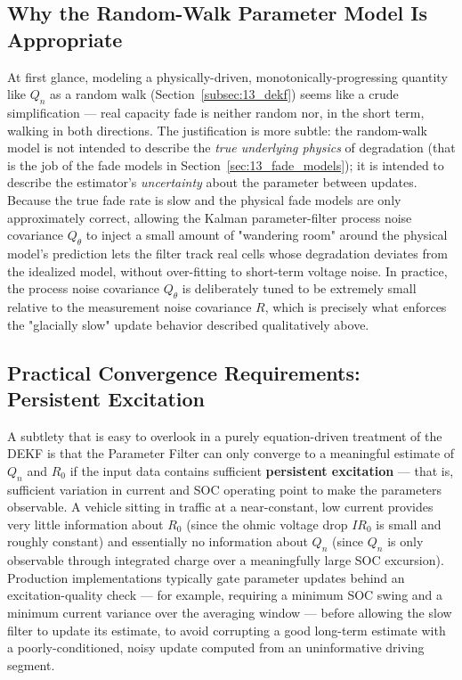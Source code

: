 \subsection{Why the Random-Walk Parameter Model Is Appropriate}
\label{subsec:13_random_walk}

At first glance, modeling a physically-driven, monotonically-progressing quantity like $Q_n$ as a random walk (Section~\ref{subsec:13_dekf}) seems like a crude simplification — real capacity fade is neither random nor, in the short term, walking in both directions. The justification is more subtle: the random-walk model is not intended to describe the \emph{true underlying physics} of degradation (that is the job of the fade models in Section~\ref{sec:13_fade_models}); it is intended to describe the estimator's \emph{uncertainty} about the parameter between updates. Because the true fade rate is slow and the physical fade models are only approximately correct, allowing the Kalman parameter-filter process noise covariance $Q_\theta$ to inject a small amount of "wandering room" around the physical model's prediction lets the filter track real cells whose degradation deviates from the idealized model, without over-fitting to short-term voltage noise. In practice, the process noise covariance $Q_\theta$ is deliberately tuned to be extremely small relative to the measurement noise covariance $R$, which is precisely what enforces the "glacially slow" update behavior described qualitatively above.

\subsection{Practical Convergence Requirements: Persistent Excitation}
\label{subsec:13_persistent_excitation}

A subtlety that is easy to overlook in a purely equation-driven treatment of the DEKF is that the Parameter Filter can only converge to a meaningful estimate of $Q_n$ and $R_0$ if the input data contains sufficient \textbf{persistent excitation} — that is, sufficient variation in current and SOC operating point to make the parameters observable. A vehicle sitting in traffic at a near-constant, low current provides very little information about $R_0$ (since the ohmic voltage drop $I R_0$ is small and roughly constant) and essentially no information about $Q_n$ (since $Q_n$ is only observable through integrated charge over a meaningfully large SOC excursion). Production implementations typically gate parameter updates behind an excitation-quality check — for example, requiring a minimum SOC swing and a minimum current variance over the averaging window — before allowing the slow filter to update its estimate, to avoid corrupting a good long-term estimate with a poorly-conditioned, noisy update computed from an uninformative driving segment.


